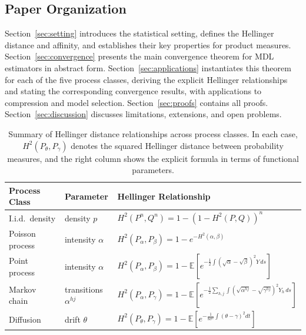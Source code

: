 \documentclass[preprint,review,12pt]{article}
\begin{document}
\subsection{Paper Organization}

Section~\ref{sec:setting} introduces the statistical setting, defines the 
Hellinger distance and affinity, and establishes their key properties for 
product measures. Section~\ref{sec:convergence} presents the main convergence 
theorem for MDL estimators in abstract form. Section~\ref{sec:applications} 
instantiates this theorem for each of the five process classes, deriving 
the explicit Hellinger relationships and stating the corresponding 
convergence results, with applications to compression and model selection. 
Section~\ref{sec:proofs} contains all proofs. Section~\ref{sec:discussion} 
discusses limitations, extensions, and open problems.


\begin{table}[t]
\centering
\caption{Summary of Hellinger distance relationships across process classes. 
	In each case, $H^2(P_\theta, P_\gamma)$ denotes the squared Hellinger distance 
	between probability measures, and the right column shows the explicit formula 
	in terms of functional parameters.}
\label{tab:hellinger_summary}
\begin{tabular}{@{}lll@{}}
	\toprule
	\textbf{Process Class} & \textbf{Parameter} & \textbf{Hellinger Relationship} \\
	\midrule
	I.i.d.\ density & density $p$ & 
	$H^2(P^n, Q^n) = 1 - (1 - H^2(P,Q))^n$ \\[6pt]
	Poisson process & intensity $\alpha$ & 
	$H^2(P_\alpha, P_\beta) = 1 - e^{-H^2(\alpha, \beta)}$ \\[6pt]
	Point process & intensity $\alpha$ & 
	$H^2(P_\alpha, P_\beta) = 1 - \mathbb{E}\left[e^{-\frac{1}{2}\int 
		(\sqrt{\alpha} - \sqrt{\beta})^2 Y \, ds}\right]$ \\[6pt]
	Markov chain & transitions $\alpha^{hj}$ & 
	$H^2(P_\alpha, P_\gamma) = 1 - \mathbb{E}\left[e^{-\frac{1}{2}\sum_{h,j}\int 
		(\sqrt{\alpha^{hj}} - \sqrt{\gamma^{hj}})^2 Y_h \, ds}\right]$ \\[6pt]
	Diffusion & drift $\theta$ & 
	$H^2(P_\theta, P_\gamma) = 1 - \mathbb{E}\left[e^{-\frac{1}{8\sigma^2}
		\int (\theta - \gamma)^2 dt}\right]$ \\
	\bottomrule
\end{tabular}
\end{table}
\end{document}
